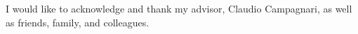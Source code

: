 \begin{acknowledgements}

I would like to acknowledge and thank my advisor, Claudio Campagnari, as well as friends, family, and colleagues.

\end{acknowledgements} 
